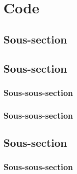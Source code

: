 \section{Code}
\noindent

\subsection{Sous-section}
\noindent

\subsection{Sous-section}
\noindent

\subsubsection{Sous-sous-section}
\noindent

\subsubsection{Sous-sous-section}
\noindent

\subsection{Sous-section}
\noindent

\subsubsection{Sous-sous-section}
\noindent